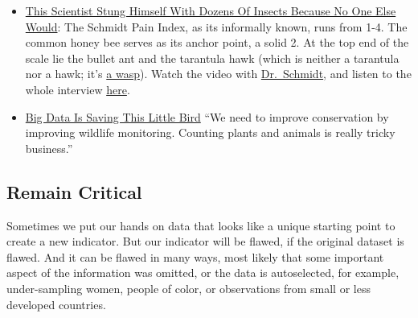 \documentclass[
  a4paper,
  openany, a4paper, oneside]{book}
\providecommand{\tightlist}{%
  \setlength{\itemsep}{0pt}\setlength{\parskip}{0pt}}
\begin{document}
\begin{itemize}
\tightlist
\item
  \href{https://fivethirtyeight.com/features/this-scientist-stung-himself-with-dozens-of-insects-because-no-one-else-would/}{This Scientist Stung Himself With Dozens Of Insects Because No One Else Would}: The Schmidt Pain Index, as its informally known, runs from 1-4. The common honey bee serves as its anchor point, a solid 2. At the top end of the scale lie the bullet ant and the tarantula hawk (which is neither a tarantula nor a hawk; it's \href{https://www.wired.com/2015/07/absurd-creature-of-the-week-tarantula-hawk/}{a wasp}). Watch the video with \href{https://youtu.be/i0LjT-qkUes}{Dr.~Schmidt}, and listen to the whole interview \href{https://podcasts.apple.com/us/podcast/48-the-schmidt-sting-pain-index/id1011406983?i=1000391467968}{here}.
\item
  \href{https://fivethirtyeight.com/features/big-data-is-saving-this-little-bird/}{Big Data Is Saving This Little Bird} ``We need to improve conservation by improving wildlife monitoring. Counting plants and animals is really tricky business.''
\end{itemize}

\hypertarget{remain-critical}{%
\subsection{Remain Critical}\label{remain-critical}}

Sometimes we put our hands on data that looks like a unique starting point to create a new indicator. But our indicator will be flawed, if the original dataset is flawed. And it can be flawed in many ways, most likely that some important aspect of the information was omitted, or the data is autoselected, for example, under-sampling women, people of color, or observations from small or less developed countries.
\end{document}
